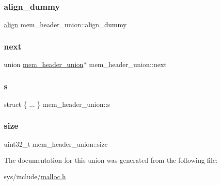 \subsubsection{\texorpdfstring{align\+\_\+dummy}{align\_dummy}}
{\footnotesize\ttfamily \hyperlink{malloc_8h_a1e0a98b5055eebe08414396335357f7f}{align} mem\+\_\+header\+\_\+union\+::align\+\_\+dummy}

\mbox{\label{unionmem__header__union_a22eb41be35488312c1e42462d5679d64}} 
\subsubsection{\texorpdfstring{next}{next}}
{\footnotesize\ttfamily union \hyperlink{unionmem__header__union}{mem\+\_\+header\+\_\+union}$\ast$ mem\+\_\+header\+\_\+union\+::next}

\mbox{\label{unionmem__header__union_a8e9bc77f2cf7596a7503f50ef29019f9}} 
\subsubsection{\texorpdfstring{s}{s}}
{\footnotesize\ttfamily struct \{ ... \}   mem\+\_\+header\+\_\+union\+::s}

\mbox{\label{unionmem__header__union_ab0a6578a8d52fd76a933d21273e73e08}} 
\subsubsection{\texorpdfstring{size}{size}}
{\footnotesize\ttfamily uint32\+\_\+t mem\+\_\+header\+\_\+union\+::size}



The documentation for this union was generated from the following file\+:\begin{DoxyCompactItemize}
\item 
sys/include/\hyperlink{malloc_8h}{malloc.\+h}\end{DoxyCompactItemize}
